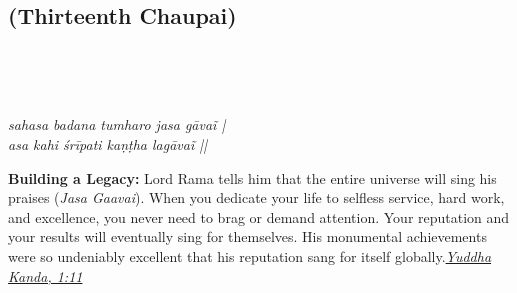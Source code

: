 
\newpage

\subsection*{ (Thirteenth Chaupai)}

\begin{minipage}[t]{0.55\textwidth}
\vspace{0pt}

{\large \linespread{1.5}\selectfont
{}\\
\par}

\vspace{0.5em}

{\large \linespread{1.5}\selectfont
{}\\
\par}

\vspace{0.5em}

{\large \linespread{1.3}\selectfont
\textit{sahasa badana tumharo jasa gāvaĩ |}\\
\textit{asa kahi śrīpati kaṇṭha lagāvaĩ ||}
\par}
\end{minipage}%
\hfill
\begin{minipage}[t]{0.42\textwidth}
\vspace{0pt}
\begin{tcolorbox}[anchorbox]
\textbf{Building a Legacy:} Lord Rama tells him that the entire universe will sing his praises (\textit{Jasa Gaavai}). When you dedicate your life to selfless service, hard work, and excellence, you never need to brag or demand attention. Your reputation and your results will eventually sing for themselves.
\vspace{0.5em}\newline His monumental achievements were so undeniably excellent that his reputation sang for itself globally.\newline\null\hfill\href{https://www.valmiki.iitk.ac.in/sloka?field_kanda_tid=6&language=dv&field_sarga_value=1}{\textit{Yuddha Kanda, 1:11}}
\end{tcolorbox}
\end{minipage}

